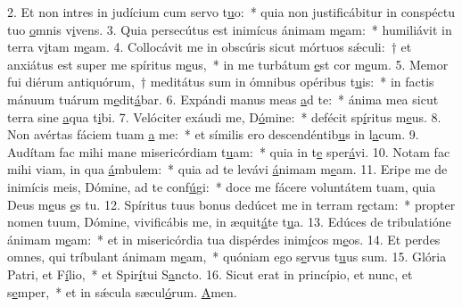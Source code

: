 2. Et non intres in judícium cum servo t\uline{u}o:~* quia non justificábitur in conspéctu tuo \uline{o}mnis v\uline{i}vens.
3. Quia persecútus est inimícus ánimam m\uline{e}am:~* humiliávit in terra v\uline{i}tam m\uline{e}am.
4. Collocávit me in obscúris sicut mórtuos sǽculi:~† et anxiátus est super me spíritus m\uline{e}us,~* in me turbátum \uline{e}st cor m\uline{e}um.
5. Memor fui diérum antiquórum,~† meditátus sum in ómnibus opéribus t\uline{u}is:~* in factis mánuum tuárum m\uline{e}dit\uline{á}bar.
6. Expándi manus meas \uline{a}d te:~* ánima mea sicut terra sine \uline{a}qua t\uline{i}bi.
7. Velóciter exáudi me, D\uline{ó}mine:~* defécit sp\uline{í}ritus m\uline{e}us.
8. Non avértas fáciem tuam \uline{a} me:~* et símilis ero descendéntib\uline{u}s in l\uline{a}cum.
9. Audítam fac mihi mane misericórdiam t\uline{u}am:~* quia in t\uline{e} sper\uline{á}vi.
10. Notam fac mihi viam, in qua \uline{á}mbulem:~* quia ad te levávi \uline{á}nimam m\uline{e}am.
11. Eripe me de inimícis meis, Dómine, ad te conf\uline{ú}gi:~* doce me fácere voluntátem tuam, quia Deus m\uline{e}us \uline{e}s tu.
12. Spíritus tuus bonus dedúcet me in terram r\uline{e}ctam:~* propter nomen tuum, Dómine, vivificábis me, in æquit\uline{á}te t\uline{u}a.
13. Edúces de tribulatióne ánimam m\uline{e}am:~* et in misericórdia tua dispérdes inim\uline{í}cos m\uline{e}os.
14. Et perdes omnes, qui tríbulant ánimam m\uline{e}am,~* quóniam ego s\uline{e}rvus t\uline{u}us sum.
15. Glória Patri, et F\uline{í}lio,~* et Spir\uline{í}tui S\uline{a}ncto.
16. Sicut erat in princípio, et nunc, et s\uline{e}mper,~* et in sǽcula sæcul\uline{ó}rum. \uline{A}men.
